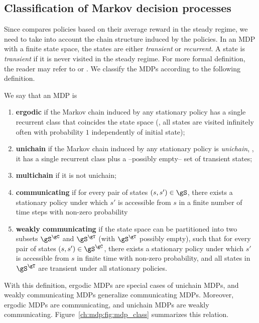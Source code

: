 \subsection{Classification of Markov decision processes}
Since  compares policies based on their average reward in the steady regime, we need to take into account the chain structure induced by the policies.
In an MDP with a finite state space, the states are either \emph{transient} or \emph{recurrent}.
A state is \emph{transient} if it is never visited in the steady regime.
For more formal definition, the reader may refer to \cite[Appendix~A]{puterman2014markov} or \cite{levin2017markov}.
We classify the MDPs according to the following definition.
\begin{defn}
    \label{ch:mdp:defn:mdp_class}
    We say that an MDP is
    \begin{enumerate}[label=(\roman*)]
        \item \textbf{ergodic} if the Markov chain induced by any stationary policy has a single recurrent class that coincides the state space (\ie, all states are visited infinitely often with probability $1$ independently of initial state);
        \item \label{it:unichain} \textbf{unichain} if the Markov chain induced by any stationary policy is \emph{unichain}, \ie, it has a single recurrent class plus a --possibly empty-- set of transient states;
        \item \textbf{multichain} if it is not unichain;
        \item \textbf{communicating} if for every pair of states $(s,s')\in\gS$, there exists a stationary policy under which $s'$ is accessible from $s$ in a finite number of time steps with non-zero probability
        \item \textbf{weakly communicating} if the state space can be partitioned into two subsets $\gS^{\gC}$ and $\gS^{\gT}$ (with $\gS^{\gT}$ possibly empty), such that for every pair of states $(s,s')\in\gS^{\gC}$, there exists a stationary policy under which $s'$ is accessible from $s$ in finite time with non-zero probability, and all states in $\gS^{\gT}$ are transient under all stationary policies.
    \end{enumerate}
\end{defn}
With this definition, ergodic MDPs are special cases of unichain MDPs, and weakly communicating MDPs generalize communicating MDPs. 
Moreover, ergodic MDPs are communicating, and unichain MDPs are weakly communicating.
Figure~\ref{ch:mdp:fig:mdp_class} summarizes this relation.

